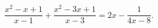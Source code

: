 \begin{ex}[type=equation]
	\begin{condition}
		$\dfrac{x^2 - x+ 1}{x - 1} + \dfrac{x^2 - 3x + 1}{x - 3} = 2x -\dfrac{1}{4x - 8}.$
	\end{condition}
\end{ex}